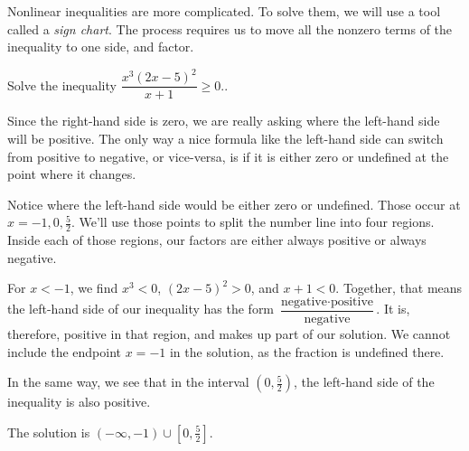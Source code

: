 \documentclass{ximera}
\begin{document}
Nonlinear inequalities are more complicated.  To solve them, we will use a tool called a \emph{sign chart}.
The process requires us to move all the nonzero terms of the inequality to one side, and factor.
\begin{example}
	Solve the inequality $\displaystyle \dfrac{x^3 \left(2x-5\right)^2}{x+1} \geq 0.$.

	\begin{explanation}
		Since the right-hand side is zero, we are really asking where the left-hand side will be positive.  The only way
		a nice formula like the left-hand side can switch from positive to negative, or vice-versa, is if it is either zero
		or undefined at the point where it changes.

		Notice where the left-hand side would be either zero or undefined.  Those occur at $x = -1, 0, \frac{5}{2}$.  
		We'll use those points to split the number line into four regions. Inside each of those regions, our factors are either
		always positive or always negative.
		
		
		For $x < -1$, we find $x^3 < 0$, $(2x-5)^2 > 0$, and $x+1 < 0$.  Together, that means the left-hand side of our inequality has the form 
		$\displaystyle \dfrac{ \textrm{negative} \cdot \textrm{positive}}{\textrm{negative}}$.  It is, therefore, positive in that region, and makes up
		part of our solution.  We cannot include the endpoint $x=-1$ in the solution, as the fraction is undefined there.
		
		In the same way, we see that in the interval $\left( 0, \frac{5}{2} \right)$, the left-hand side of the inequality is also positive.  
		
		The solution is $\left( -\infty, -1 \right) \cup \left[ 0, \frac{5}{2} \right]$.
	\end{explanation}
\end{example}

\end{document}
